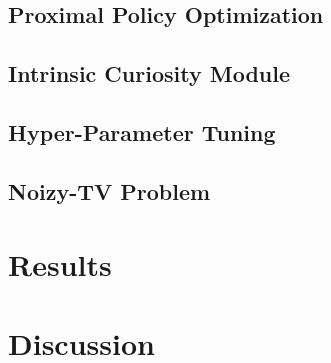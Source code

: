 \documentclass[draft,final]{vutinfth} %
\begin{document}
    \section{Proximal Policy Optimization}


    \section{Intrinsic Curiosity Module}
    \citep{pathak_curiosity-driven_2017-1}


    \section{Hyper-Parameter Tuning}


    \section{Noizy-TV Problem}
    \citep{schmidhuber_formal_2010}

    \glsresetall


    \chapter{Results}


    \glsresetall


    \chapter{Discussion}

    \backmatter
    \listoffigures %

    \cleardoublepage %
    \listoftables %

    \listofalgorithms

    \printindex

    \printglossaries

    
    

\end{document}
